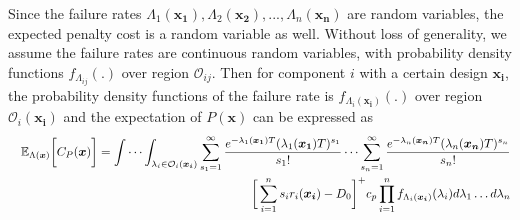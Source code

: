 \documentclass[preprint,12pt]{elsarticle}
\begin{document}
Since the failure rates $\Lambda_{1}(\boldsymbol{x_{1}}),\Lambda_{2}(\boldsymbol{x_{2}}),...,\Lambda_{n}(\boldsymbol{x_{n}})$ are random variables, the expected penalty cost is a random variable as well. Without loss of generality, we assume the failure rates are continuous random variables, with probability density functions $f_{\Lambda_{ij}}(.)$ over region $\mathcal{O}_{ij}$. Then for component $i$ with a certain design $\boldsymbol{x_{i}}$, the probability density functions of the failure rate is $f_{\Lambda_{i}(\boldsymbol{x_{i}})}(.)$ over region $\mathcal{O}_{i}(\boldsymbol{x_{i}})$ and the expectation of $P(\boldsymbol{x})$ can be expressed as
\begin{eqnarray}
&& \mathbb{E}_{\Lambda(\boldsymbol{x})} \bigg[C_{P}(\boldsymbol{x}) \bigg]=
\idotsint_{\lambda_{i} \in \mathcal{O}_{i}(\boldsymbol{x_i})} \sum_{s_{1}=1}^{\infty}{ \frac{e^{-\lambda_{1}(\boldsymbol{x_{1}})T}(\lambda_{1}(\boldsymbol{x_{1}})T)^{s_{1}}}{s_{1}!}}\dots\sum_{s_{n}=1}^{\infty}{\frac{e^{-\lambda_{n}(\boldsymbol{x_{n}})T}(\lambda_{n}(\boldsymbol{x_{n}})T)^{s_{n}}}{s_{n}!}} \nonumber\\
 &&\bigg[\sum_{i=1}^{n}{s_{i}r_{i}(\boldsymbol{x_{i}})}-D_{0}\bigg]^{+}c_{p}\prod_{i=1}^{n}{f_{\Lambda_{i}(\boldsymbol{x_{i}})}(\lambda_{i})d\lambda_{1}\dots d\lambda_{n}} \nonumber
\end{eqnarray}
\end{document}
